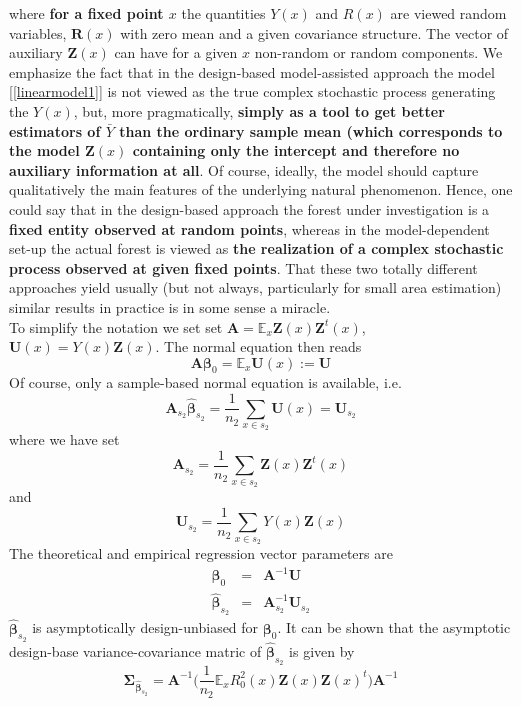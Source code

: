 \documentclass[a4paper,12pt,leqno, titlepage]{article}
\newcommand{\EX}{\mathbb{E}}
\begin{document}
 where \textbf{for a fixed point $x$} the quantities $Y(x)$ and $R(x)$ are viewed random variables, $\pmb{R}(x)$ with zero mean and a given covariance structure. The vector of auxiliary $\pmb{Z}(x)$ can have for a given $x$ non-random or random components. We emphasize the fact that in the design-based model-assisted approach the model [\ref{linearmodel1}] is not viewed as the true complex stochastic process generating the $Y(x)$, but, more pragmatically, \textbf{simply as a tool to get better estimators of $\bar{Y}$ than the ordinary sample mean (which corresponds to the model $\pmb{Z}(x)$ containing only the intercept and therefore no auxiliary information at all}. Of course, ideally, the model should capture qualitatively the main features of the underlying natural phenomenon. Hence, one could say that in the design-based approach the forest under investigation is a \textbf{fixed entity observed at random points}, whereas in the model-dependent set-up the actual forest is viewed as \textbf{the realization of a complex stochastic process observed at given fixed points}. That these two totally different approaches yield usually (but not always, particularly for small area estimation) similar results in practice is in some sense a miracle.\\
 To simplify the notation we set
 set $\pmb{A}=\EX_x\pmb{Z}(x)\pmb{Z}^t(x)$, $\pmb{U}(x)=Y(x)\pmb{Z}(x)$.
 The normal equation then reads
 $$\pmb{A}\pmb{\beta}_0=\EX_x\pmb{U}(x):=\pmb{U}$$
 Of course, only a sample-based normal equation is available, i.e.
 $$\pmb{A}_{s_2}\hat{\pmb{\beta}}_{s_2}=\frac{1}{n_2}\sum_{x\in{s_2}}\pmb{U}(x)=\pmb{U}_{s_2}$$
 where we have set
 $$\pmb{A}_{s_2}=\frac{1}{n_2}\sum_{x\in{s_2}}\pmb{Z}(x)\pmb{Z}^t(x)$$ and
 $$\pmb{U}_{s_2}=\frac{1}{n_2}\sum_{x\in{s_2}}Y(x)\pmb{Z}(x)$$
 The theoretical and empirical regression vector parameters are
 \begin{eqnarray}\label{linearmodel3}
 \pmb{\beta}_0&=&\pmb{A}^{-1}\pmb{U} \nonumber \\
 \hat{\pmb{\beta}}_{s_2}&=&\pmb{A}_{s_2}^{-1}\pmb{U}_{s_2}
 \end{eqnarray}
$\hat{\pmb{\beta}}_{s_2}$ is asymptotically design-unbiased for
$\pmb{\beta}_0$.
It can be shown that the asymptotic design-base variance-covariance matric of $\hat{\pmb{\beta}}_{s_2}$ is given by
\begin{equation}\label{varmatrix}
\pmb{\Sigma}_{\hat{\pmb{\beta}}_{s_2}}=
\pmb{A}^{-1}\Big(\frac{1}{n_2}\EX_xR_0^2(x)\pmb{Z}(x)\pmb{Z}(x)^t\Big)\pmb{A}^{-1}
\end{equation}
\end{document}
